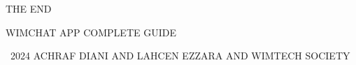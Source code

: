 \documentclass[
	11pt, %
]{beamer}
\begin{document}

\begin{frame}[plain]
    \begin{center}
    	
    	\bigskip\bigskip\bigskip\bigskip\bigskip
    	
    	
        {\Huge THE END}
        
        \bigskip\bigskip
        
        {\LARGE WIMCHAT APP COMPLETE GUIDE}
    \end{center}

	\bigskip\bigskip

    \begin{center}
        \small
        \textcopyright\ 2024 ACHRAF DIANI AND LAHCEN EZZARA AND WIMTECH SOCIETY
    \end{center}
\end{frame}


\end{document}

